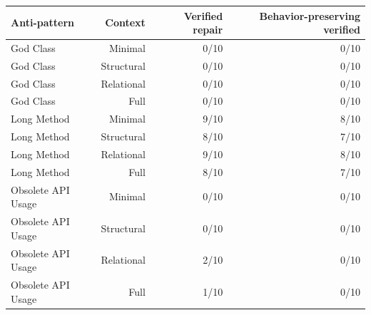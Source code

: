 \begin{tabular}{lrrr}
\toprule
Anti-pattern & Context & Verified repair & Behavior-preserving verified \\
\midrule
God Class & Minimal & 0/10 & 0/10 \\
God Class & Structural & 0/10 & 0/10 \\
God Class & Relational & 0/10 & 0/10 \\
God Class & Full & 0/10 & 0/10 \\
Long Method & Minimal & 9/10 & 8/10 \\
Long Method & Structural & 8/10 & 7/10 \\
Long Method & Relational & 9/10 & 8/10 \\
Long Method & Full & 8/10 & 7/10 \\
Obsolete API Usage & Minimal & 0/10 & 0/10 \\
Obsolete API Usage & Structural & 0/10 & 0/10 \\
Obsolete API Usage & Relational & 2/10 & 0/10 \\
Obsolete API Usage & Full & 1/10 & 0/10 \\
\bottomrule
\end{tabular}
